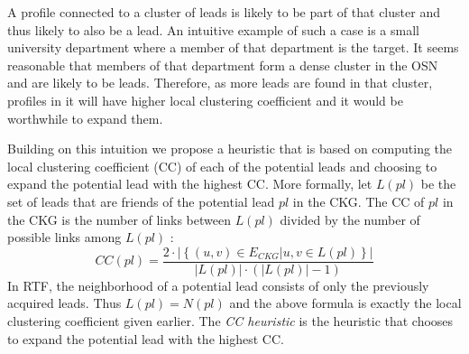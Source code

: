 \documentclass[journal]{IEEEtran}
\begin{document}


A profile connected to a cluster of leads is likely to be part of that cluster and thus likely to also be a lead. 
An intuitive example of such a case is a small university department where a member of that department is the target. It seems reasonable that members of that department form a dense cluster in the OSN and are likely to be leads. Therefore, as more leads are found in that cluster, profiles in it will have higher local clustering coefficient and it would be worthwhile to expand them.


Building on this intuition we propose a heuristic that is based on computing the local clustering coefficient (CC) of each of the potential leads and choosing to expand the potential lead with the highest CC. 
More formally, let $L(pl)$ be the set of leads that are friends of the potential lead $pl$ in the CKG. The CC of $pl$ in the CKG is the number of links between $L(pl)$ divided by the number of possible links among $L(pl)$ :
\begin{equation}
CC(pl)=\frac{2\cdot\left|\left\{(u,v)\in E_{CKG} | u,v\in L(pl)\right\}\right|}{|L(pl)|\cdot(|L(pl)|-1)}
\end{equation}
In RTF, the neighborhood of a potential lead consists of only the previously acquired leads. Thus $L(pl)=N(pl)$ and the above formula is exactly the local clustering coefficient given earlier. The {\em CC heuristic} is the heuristic that chooses to expand the potential lead with the highest CC. 
\end{document}
